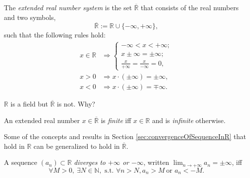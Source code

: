 \begin{defn}
  \label{def:extendedReals}
  The \emph{extended real number system} is 
  the set $\overline{\mathbb{R}}$ that consists of the real numbers %
   and two symbols, %
  \begin{equation}
    \label{eq:extendedReals}
    \overline{\mathbb{R}} := \mathbb{R} \cup \{-\infty, + \infty\}, 
  \end{equation}
  such that the following rules hold:
  \begin{subequations}
    \label{eq:extendedRealsConditions}
    \begin{align}
      x\in \mathbb{R}
      &\Rightarrow \left\{
        \begin{array}{l}
          -\infty < x < +\infty; 
          \\
          x\pm\infty = \pm\infty; %
          \\
          \frac{x}{+\infty} = \frac{x}{-\infty} = 0,
        \end{array}\right.
      \\
      x>0 &\Rightarrow x\cdot(\pm\infty) = \pm \infty,
      \\
      x<0 &\Rightarrow x\cdot(\pm\infty) = \mp \infty.
    \end{align}
  \end{subequations}
\end{defn}

\begin{rem}
  $\mathbb{R}$ is a field but $\overline{\mathbb{R}}$ is not.
  Why?
\end{rem}

\begin{defn}
  An extended real number $x\in \overline{\mathbb{R}}$
  is \emph{finite} iff $x\in \mathbb{R}$
  and is \emph{infinite} otherwise.
\end{defn}

\begin{rem}
  Some of the concepts and results in Section
  \ref{sec:convergenceOfSequenceInR}
  that hold in $\mathbb{R}$
  can be generalized to hold in $\overline{\mathbb{R}}$. 
\end{rem}

\begin{defn}
  \label{def:divergeToInfty}
  A sequence $(a_n)\subset \mathbb{R}$
  \emph{diverges to $+\infty$ or $-\infty$},
  written $\lim_{n\rightarrow +\infty} a_n = \pm \infty$,
  iff
  \begin{equation}
    \label{eq:divergeToInfty}
    \forall M>0,\ \exists N\in \mathbb{N},\text{ s.t. }
    \forall n>N, a_{n}>M\ \text{or }a_{n}<-M.
  \end{equation}
\end{defn}

